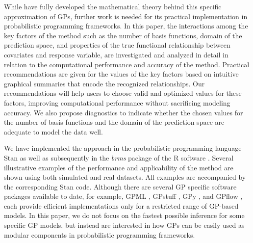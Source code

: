 \documentclass[onecolumn,a4paper,11pt]{article}
\begin{document}
While \citet{solin2018hilbert} have fully developed the mathematical theory behind this specific approximation of GPs, further work is needed for its practical implementation in probabilistic programming frameworks. In this paper, the interactions among the key factors of the method such as the number of basis functions, domain of the prediction space, and properties of the true functional relationship between covariates and response variable, are investigated and analyzed in detail in relation to the computational performance and accuracy of the method. Practical recommendations are given for the values of the key factors based on intuitive graphical summaries that encode the recognized relationships. Our recommendations will help users to choose valid and optimized values for these factors, improving computational performance without sacrificing modeling accuracy. We also propose  diagnostics to indicate whether the chosen values for the number of basis functions and the domain of the prediction space are adequate to model the data well.


We have implemented the approach in the probabilistic programming language Stan \citep{carpenter2017stan} as well as subsequently in the \textit{brms} package \citep{burkner2017brms} of the R software \citep{R2019R}. Several illustrative examples of the performance and applicability of the method are shown using both simulated and real datasets. All examples are accompanied by the corresponding Stan code. Although there are several GP specific software packages available to date, for example, GPML \citep{rasmussen2010gpml},  GPstuff \citep{vanhatalo2013gpstuff}, GPy \citep{gpy2014}, and GPflow \citep{GPflow2017}, each provide efficient implementations only for a restricted range of GP-based models. In this paper, we do not focus on the fastest possible inference for some specific GP models, but instead are interested in how GPs can be easily used as modular components in probabilistic programming frameworks. 
\end{document}
